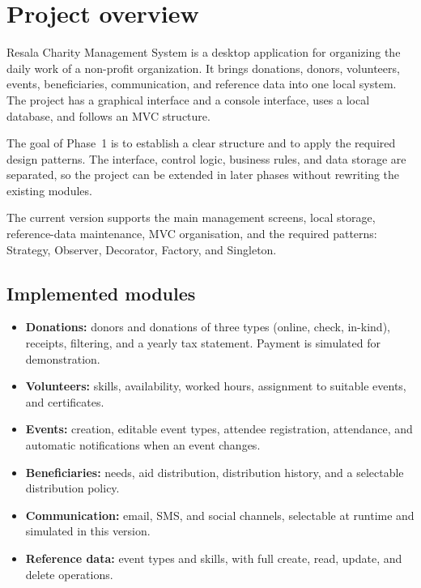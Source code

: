 \section{Project overview}

Resala Charity Management System is a desktop application for organizing the daily work of a non-profit organization. It brings donations, donors, volunteers, events, beneficiaries, communication, and reference data into one local system. The project has a graphical interface and a console interface, uses a local database, and follows an MVC structure.

The goal of Phase~1 is to establish a clear structure and to apply the required design patterns. The interface, control logic, business rules, and data storage are separated, so the project can be extended in later phases without rewriting the existing modules.

\begin{tcolorbox}[colback=softBlue,colframe=asuBlue,title=Phase 1 scope]
The current version supports the main management screens, local storage, reference-data maintenance, MVC organisation, and the required patterns: Strategy, Observer, Decorator, Factory, and Singleton.
\end{tcolorbox}

\subsection{Implemented modules}

\begin{itemize}
  \item \textbf{Donations:} donors and donations of three types (online, check, in-kind), receipts, filtering, and a yearly tax statement. Payment is simulated for demonstration.
  \item \textbf{Volunteers:} skills, availability, worked hours, assignment to suitable events, and certificates.
  \item \textbf{Events:} creation, editable event types, attendee registration, attendance, and automatic notifications when an event changes.
  \item \textbf{Beneficiaries:} needs, aid distribution, distribution history, and a selectable distribution policy.
  \item \textbf{Communication:} email, SMS, and social channels, selectable at runtime and simulated in this version.
  \item \textbf{Reference data:} event types and skills, with full create, read, update, and delete operations.
\end{itemize}

